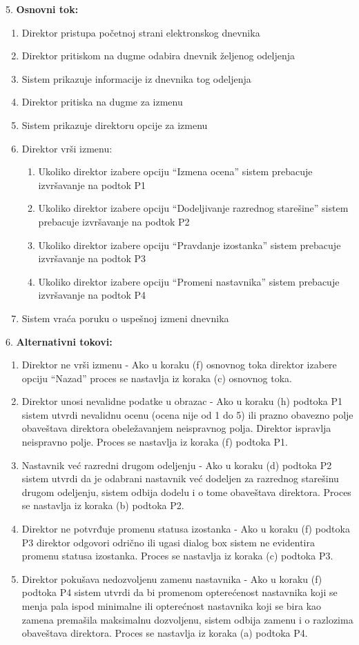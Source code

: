 \documentclass{article}
\begin{document}
5. \textbf{Osnovni tok:} 
\begin{enumerate} [label=(\alph*)]
\item Direktor pristupa početnoj strani elektronskog dnevnika
\item Direktor pritiskom na dugme odabira dnevnik željenog odeljenja
\item Sistem prikazuje informacije iz dnevnika tog odeljenja
\item Direktor pritiska na dugme za izmenu
\item Sistem prikazuje direktoru opcije za izmenu
\item Direktor vrši izmenu:
\begin{enumerate} [label=(\roman*)]
    \item Ukoliko direktor izabere opciju ``Izmena ocena'' sistem prebacuje izvršavanje na podtok P1
    \item Ukoliko direktor izabere opciju ``Dodeljivanje razrednog starešine'' sistem prebacuje izvršavanje na podtok P2
    \item Ukoliko direktor izabere opciju ``Pravdanje izostanka'' sistem prebacuje izvršavanje na podtok P3
    \item Ukoliko direktor izabere opciju ``Promeni nastavnika'' sistem prebacuje izvršavanje na podtok P4
\end{enumerate}
\item Sistem vraća poruku o uspešnoj izmeni dnevnika

\end{enumerate}

6. \textbf{Alternativni tokovi:}
\begin{enumerate} [label=(\roman*)]
    \item Direktor ne vrši izmenu - Ako u koraku (f) osnovnog toka direktor izabere opciju ``Nazad'' proces se nastavlja iz koraka (c) osnovnog toka.
    \item Direktor unosi nevalidne podatke u obrazac - Ako u koraku (h) podtoka P1 sistem utvrdi nevalidnu ocenu (ocena nije od 1 do 5) ili prazno obavezno polje obaveštava direktora obeležavanjem neispravnog polja. Direktor ispravlja neispravno polje. Proces se nastavlja iz koraka (f) podtoka P1.
    \item Nastavnik već razredni drugom odeljenju - Ako u koraku (d) podtoka P2 sistem utvrdi da je odabrani nastavnik već dodeljen za razrednog starešinu drugom odeljenju, sistem odbija dodelu i o tome obaveštava direktora. Proces se nastavlja iz koraka (b) podtoka P2.
    \item Direktor ne potvrđuje promenu statusa izostanka - Ako u koraku (f) podtoka P3 direktor odgovori odrično ili ugasi dialog box sistem ne evidentira promenu statusa izostanka. Proces se nastavlja iz koraka (c) podtoka P3.
    \item Direktor pokušava nedozvoljenu zamenu nastavnika - Ako u koraku (f) podtoka P4 sistem utvrdi da bi promenom opterećenost nastavnika koji se menja pala ispod minimalne ili opterećnost nastavnika koji se bira kao zamena premašila maksimalnu dozvoljenu, sistem odbija zamenu i o razlozima obaveštava direktora. Proces se nastavlja iz koraka (a) podtoka P4.
\end{enumerate}
\end{document}
